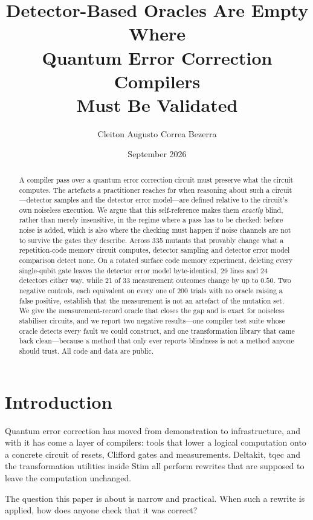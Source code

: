 \documentclass[twocolumn,10pt]{article}
\title{\textbf{Detector-Based Oracles Are Empty Where\\
Quantum Error Correction Compilers\\
Must Be Validated}}
\author{Cleiton Augusto Correa Bezerra}
\affil{Independent Researcher\\
\texttt{augusto.cleiton@gmail.com}}
\date{September 2026}
\begin{document}
\maketitle

\begin{abstract}
A compiler pass over a quantum error correction circuit must preserve what the
circuit computes. The artefacts a practitioner reaches for when reasoning about
such a circuit---detector samples and the detector error model---are defined
relative to the circuit's own noiseless execution. We argue that this
self-reference makes them \emph{exactly} blind, rather than merely insensitive,
in the regime where a pass has to be checked: before noise is added, which is
also where the checking must happen if noise channels are not to survive the
gates they describe. Across 335 mutants that provably change what a
repetition-code memory circuit computes, detector sampling and detector error
model comparison detect none. On a rotated surface code memory experiment,
deleting every single-qubit gate leaves the detector error model byte-identical,
29 lines and 24 detectors either way, while 21 of 33 measurement outcomes change
by up to $0.50$. Two negative controls, each equivalent on every one of 200
trials with no oracle raising a false positive, establish that the measurement
is not an artefact of the mutation set. We give the measurement-record oracle
that closes the gap and is exact for noiseless stabiliser circuits, and we report
two negative results---one compiler test suite whose oracle detects every fault
we could construct, and one transformation library that came back clean---because
a method that only ever reports blindness is not a method anyone should trust.
All code and data are public.
\end{abstract}

\section{Introduction}

Quantum error correction has moved from demonstration to infrastructure, and
with it has come a layer of compilers: tools that lower a logical computation
onto a concrete circuit of resets, Clifford gates and measurements. Deltakit,
tqec and the transformation utilities inside Stim all perform rewrites that are
supposed to leave the computation unchanged.

The question this paper is about is narrow and practical. When such a rewrite is
applied, how does anyone check that it was correct?
\end{document}
